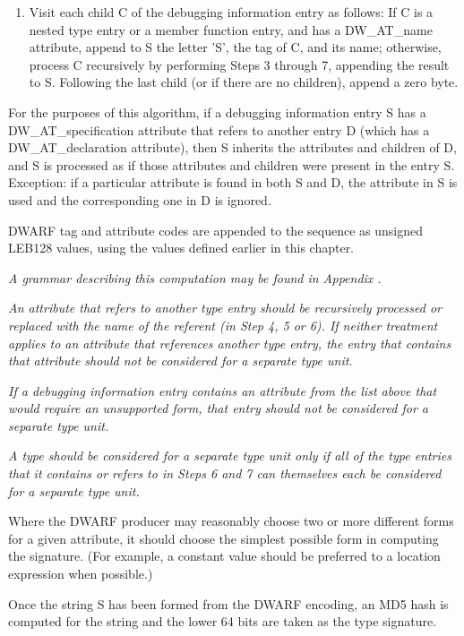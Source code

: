 \begin{enumerate}[1.]
\item Visit each child C of the debugging information
entry as follows: If C is a nested type entry or a member
function entry, and has a DW\-\_AT\-\_name attribute, append to
S the letter 'S', the tag of C, and its name; otherwise,
process C recursively by performing Steps 3 through 7,
appending the result to S. Following the last child (or if
there are no children), append a zero byte.
\end{enumerate}



For the purposes of this algorithm, if a debugging information
entry S has a 
DW\-\_AT\-\_specification 
attribute that refers to
another entry D (which has a 
DW\-\_AT\-\_declaration 
attribute),
then S inherits the attributes and children of D, and S is
processed as if those attributes and children were present in
the entry S. Exception: if a particular attribute is found in
both S and D, the attribute in S is used and the corresponding
one in D is ignored.

DWARF tag and attribute codes are appended to the sequence
as unsigned LEB128 values, using the values defined earlier
in this chapter.

\textit{A grammar describing this computation may be found in
Appendix .
}

\textit{An attribute that refers to another type entry should
be recursively processed or replaced with the name of the
referent (in Step 4, 5 or 6). If neither treatment applies to
an attribute that references another type entry, the entry
that contains that attribute should not be considered for a
separate type unit.}

\textit{If a debugging information entry contains an attribute from
the list above that would require an unsupported form, that
entry should not be considered for a separate type unit.}

\textit{A type should be considered for a separate type unit only
if all of the type entries that it contains or refers to in
Steps 6 and 7 can themselves each be considered for a separate
type unit.}

Where the DWARF producer may reasonably choose two or more
different forms for a given attribute, it should choose
the simplest possible form in computing the signature. (For
example, a constant value should be preferred to a location
expression when possible.)

Once the string S has been formed from the DWARF encoding,
an MD5 hash is computed for the string and the lower 64 bits
are taken as the type signature.

